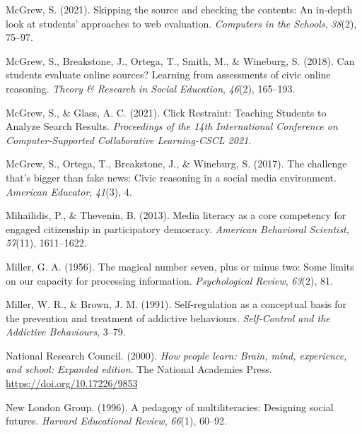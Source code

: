 \documentclass[letterpaper, nobind]{templates/ociamthesis}
\newlength{\cslhangindent}
\newenvironment{CSLReferences}[2] %
 {%
  \setlength{\parindent}{0pt}
  \ifodd #1
  \let\oldpar\par
  \def\par{\hangindent=\cslhangindent\oldpar}
  \fi
  \setlength{\parskip}{1mm}
  \setlength{\baselineskip}{6mm}
 }%
 {}
\begin{document}
\begin{CSLReferences}{1}{0}
\leavevmode{}%
McGrew, S. (2021). Skipping the source and checking the contents: An in-depth look at students' approaches to web evaluation. \emph{Computers in the Schools}, \emph{38}(2), 75--97.

\leavevmode{}%
McGrew, S., Breakstone, J., Ortega, T., Smith, M., \& Wineburg, S. (2018). Can students evaluate online sources? Learning from assessments of civic online reasoning. \emph{Theory \& Research in Social Education}, \emph{46}(2), 165--193.

\leavevmode{}%
McGrew, S., \& Glass, A. C. (2021). Click {Restraint}: Teaching {Students} to {Analyze Search Results}. \emph{Proceedings of the 14th {International Conference} on {Computer}-{Supported Collaborative Learning}-{CSCL} 2021}.

\leavevmode{}%
McGrew, S., Ortega, T., Breakstone, J., \& Wineburg, S. (2017). The challenge that's bigger than fake news: Civic reasoning in a social media environment. \emph{American Educator}, \emph{41}(3), 4.

\leavevmode{}%
Mihailidis, P., \& Thevenin, B. (2013). Media literacy as a core competency for engaged citizenship in participatory democracy. \emph{American Behavioral Scientist}, \emph{57}(11), 1611--1622.

\leavevmode{}%
Miller, G. A. (1956). The magical number seven, plus or minus two: Some limits on our capacity for processing information. \emph{Psychological Review}, \emph{63}(2), 81.

\leavevmode{}%
Miller, W. R., \& Brown, J. M. (1991). Self-regulation as a conceptual basis for the prevention and treatment of addictive behaviours. \emph{Self-Control and the Addictive Behaviours}, 3--79.

\leavevmode{}%
National Research Council. (2000). \emph{How people learn: {Brain}, mind, experience, and school: {Expanded} edition}. {The National Academies Press}. \url{https://doi.org/10.17226/9853}

\leavevmode{}%
New London Group. (1996). A pedagogy of multiliteracies: Designing social futures. \emph{Harvard Educational Review}, \emph{66}(1), 60--92.


\end{CSLReferences}
\end{document}
